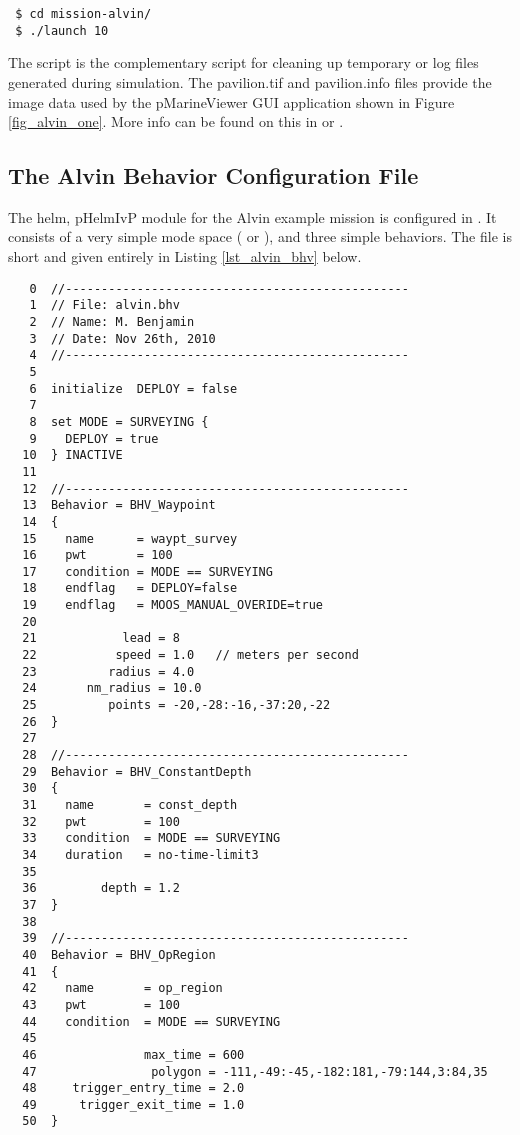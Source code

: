 \footnotesize
\begin{verbatim}
 $ cd mission-alvin/
 $ ./launch 10
\end{verbatim}
\normalsize

\noindent
The  script is the complementary script for cleaning up
temporary or log files generated during simulation. The pavilion.tif
and pavilion.info files provide the image data used by the pMarineViewer
GUI application shown in Figure \ref{fig_alvin_one}. More info can be
found on this in \cite{ben10} or \cite{bnsl10a}.

\subsection{The Alvin Behavior Configuration File}

The helm, pHelmIvP module for the Alvin example mission is configured
in . It consists of a very simple mode space
( or ), and three simple behaviors. The
file is short and given entirely in Listing \ref{lst_alvin_bhv} 
below. 

\vspace{0.1in}
\vspace{0.1in}
\label{lst_alvin_bhv}
\scriptsize
\begin{verbatim}
   0  //------------------------------------------------
   1  // File: alvin.bhv
   2  // Name: M. Benjamin
   3  // Date: Nov 26th, 2010
   4  //------------------------------------------------
   5  
   6  initialize  DEPLOY = false
   7  
   8  set MODE = SURVEYING {
   9    DEPLOY = true
  10  } INACTIVE
  11  
  12  //------------------------------------------------
  13  Behavior = BHV_Waypoint
  14  { 
  15    name      = waypt_survey
  16    pwt       = 100
  17    condition = MODE == SURVEYING
  18    endflag   = DEPLOY=false
  19    endflag   = MOOS_MANUAL_OVERIDE=true
  20
  21            lead = 8
  22           speed = 1.0   // meters per second
  23          radius = 4.0
  24       nm_radius = 10.0
  25          points = -20,-28:-16,-37:20,-22
  26  }
  27  
  28  //------------------------------------------------
  29  Behavior = BHV_ConstantDepth
  30  {
  31    name       = const_depth
  32    pwt        = 100
  33    condition  = MODE == SURVEYING
  34    duration   = no-time-limit3
  35  
  36         depth = 1.2
  37  }
  38  
  39  //------------------------------------------------
  40  Behavior = BHV_OpRegion
  41  {
  42    name       = op_region
  43    pwt        = 100
  44    condition  = MODE == SURVEYING
  45  
  46               max_time = 600
  47                polygon = -111,-49:-45,-182:181,-79:144,3:84,35
  48     trigger_entry_time = 2.0
  49      trigger_exit_time = 1.0
  50  }
\end{verbatim}
\normalsize

